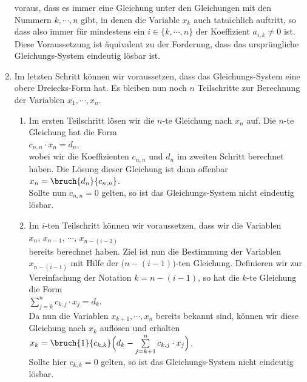\begin{enumerate}
      voraus, dass es immer eine Gleichung unter den Gleichungen mit den Nummern $k,\cdots,n$ gibt,
      in denen die Variable $x_k$ auch tats\"{a}chlich auftritt, so dass also immer f\"{u}r mindestens ein
      $i \in \{ k, \cdots, n\}$ der Koeffizient $a_{i,k} \not= 0$ ist.  
      Diese Voraussetzung ist \"{a}quivalent zu der Forderung, dass das urspr\"{u}ngliche Gleichungs-System
      eindeutig l\"{o}sbar ist.
\item Im letzten Schritt k\"{o}nnen wir voraussetzen, dass das Gleichungs-System eine obere Dreiecks-Form
      hat.  Es bleiben nun noch $n$ Teilschritte zur Berechnung der Variablen $x_1,\cdots,x_n$.
      \begin{enumerate}
      \item Im ersten Teilschritt l\"{o}sen wir die $n$-te Gleichung nach $x_n$ auf.
            Die $n$-te Gleichung hat die Form
            \\[0.2cm]
            \hspace*{1.3cm}
            $c_{n,n} \cdot x_n = d_n$,
            \\[0.2cm] 
            wobei wir die Koeffizienten $c_{n,n}$ und $d_n$ im zweiten Schritt berechnet haben.
            Die L\"{o}sung dieser Gleichung ist dann offenbar
            \\[0.2cm]
            \hspace*{1.3cm}
            $x_{n} = \bruch{d_n}{c_{n,n}}$.
            \\[0.2cm]
            Sollte nun $c_{n,n} = 0$ gelten, so ist das Gleichungs-System nicht eindeutig l\"{o}sbar.
      \item Im $i$-ten Teilschritt k\"{o}nnen wir voraussetzen, dass wir die Variablen
            \\[0.2cm]
            \hspace*{1.3cm}
            $x_n$, $x_{n-1}$, $\cdots$, $x_{n-(i-2)}$ 
            \\[0.2cm]
            bereits berechnet haben.  Ziel ist nun die Bestimmung der Variablen $x_{n-(i-1)}$ mit Hilfe
            der $\bigl(n-(i-1)\bigr)$-ten Gleichung.  Definieren wir zur Vereinfachung der Notation
            $k = n - (i-1)$, so hat die $k$-te Gleichung die Form
            \\[0.2cm]
            \hspace*{1.3cm}
            $\sum\limits_{j=k}^n c_{k,j} \cdot x_j = d_k$.
            \\[0.2cm]
            Da nun die Variablen $x_{k+1},\cdots,x_n$ bereits bekannt sind, k\"{o}nnen wir diese Gleichung
            nach $x_k$ aufl\"{o}sen und erhalten
            \\[0.2cm]
            \hspace*{1.3cm}
            $x_k = \bruch{1}{c_{k,k}} \Bigl(d_k - \sum\limits_{j=k+1}^n c_{k,j} \cdot x_j\Bigr)$.
            \\[0.2cm]
            Sollte hier $c_{k,k} = 0$ gelten, so ist das Gleichungs-System nicht eindeutig l\"{o}sbar.
      \end{enumerate}
\end{enumerate}


